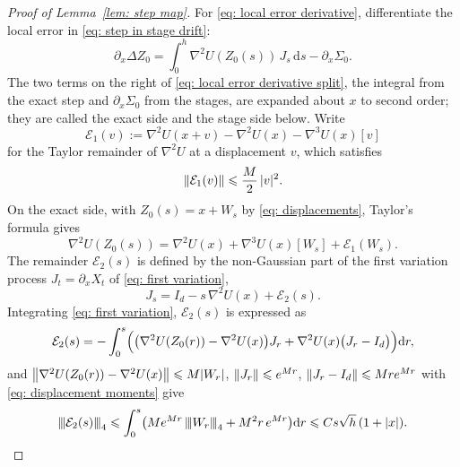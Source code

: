 \documentclass[namedate,webpdf,imanum]{ima-authoring-template}
\newcommand{\pnorm}[1]{{\vert\kern-0.25ex\vert\kern-0.25ex\vert} #1 {\vert\kern-0.25ex\vert\kern-0.25ex\vert}}
\newcommand{\Le}{\leqslant}
\newcommand{\D}{\mathrm{d}}
\theoremstyle{thmstyletwo}
\numberwithin{equation}{section}
\begin{document}
\begin{proof}[Proof of Lemma~\ref{lem: step map}]
    For \eqref{eq: local error derivative}, differentiate the local error in \eqref{eq: step in stage drift}:
    \begin{equation}
        \partial_x \Delta Z_0 = \int_0^h \nabla^2 U(Z_0(s))\, J_s\,\D s - \partial_x \Sigma_0 .
        \label{eq: local error derivative split}
    \end{equation}
    The two terms on the right of \eqref{eq: local error derivative split}, the integral from the exact step and $\partial_x \Sigma_0$ from the stages, are expanded about $x$ to second order; they are called the exact side and the stage side below. Write
    \begin{equation}
        \mathcal E_1(v) := \nabla^2 U(x + v) - \nabla^2 U(x) - \nabla^3 U(x)[v]
        \label{eq: hessian taylor remainder}
    \end{equation}
    for the Taylor remainder of $\nabla^2 U$ at a displacement $v$, which satisfies
    \begin{equation}
        \norm{\mathcal E_1(v)} \Le \frac M2\, |v|^2 .
        \label{eq: hessian taylor remainder bound}
    \end{equation}
    On the exact side, with $Z_0(s) = x + W_s$ by \eqref{eq: displacements}, Taylor's formula gives
    \begin{equation}
        \nabla^2 U(Z_0(s)) = \nabla^2 U(x) + \nabla^3 U(x)[W_s] + \mathcal E_1(W_s) .
        \label{eq: exact side expansion}
    \end{equation}
    The remainder $\mathcal E_2(s)$ is defined by the non-Gaussian part of the first variation process $J_t = \partial_x X_t$ of \eqref{eq: first variation},
    \begin{equation}
        J_s = I_d - s\, \nabla^2 U(x) + \mathcal E_2(s) .
        \label{eq: first variation expansion}
    \end{equation}
    Integrating \eqref{eq: first variation}, $\mathcal E_2(s)$ is expressed as
    \begin{equation*}
        \mathcal E_2(s) = - \int_0^s \Bigl( \bigl( \nabla^2 U(Z_0(r)) - \nabla^2 U(x) \bigr) J_r + \nabla^2 U(x) \bigl( J_r - I_d \bigr) \Bigr) \D r ,
    \end{equation*}
    and $\norm{\nabla^2 U(Z_0(r)) - \nabla^2 U(x)} \Le M |W_r|$, $\norm{J_r} \Le e^{Mr}$, $\norm{J_r - I_d} \Le M r e^{Mr}$ with \eqref{eq: displacement moments} give
    \begin{equation}
        \pnorm{\mathcal E_2(s)}_4 \Le \int_0^s \bigl( M e^{Mr}\, \pnorm{W_r}_4 + M^2 r\, e^{Mr} \bigr) \D r \Le C s \sqrt h\, (1 + |x|) .

\end{equation}
\end{proof}
\end{document}
